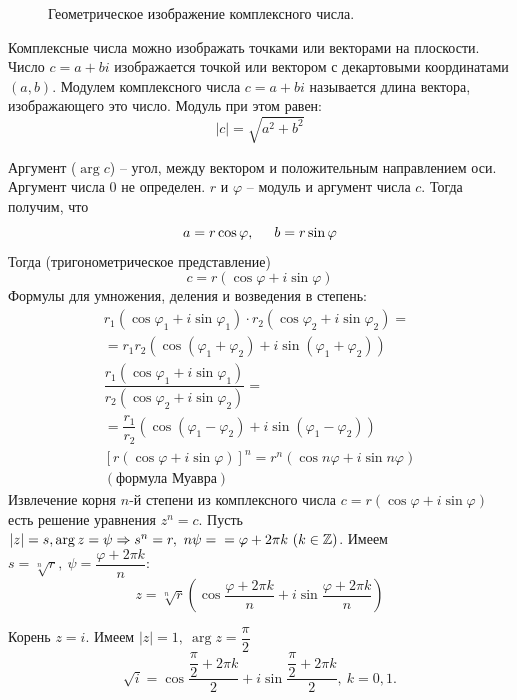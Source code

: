 \begin{multicols}{2}
\begin{figure}
    \caption{Геометрическое изображение комплексного числа.}
    \label{fig:complex_field}
\end{figure}
Комплексные числа можно изображать точками или векторами на плоскости. Число $c=a+bi$ изображается точкой или вектором с декартовыми координатами $(a,b)$.
Модулем комплексного числа $c=a+bi$ называется длина вектора, изображающего это число. Модуль при этом равен:\useshortskip
\[
    |c| = \sqrt{a^2 + b^2}
    \]
\par
Аргумент ($\arg c$) -- угол, между вектором и положительным направлением оси. Аргумент числа 0 не определен.
$r$ и $\varphi$ -- модуль и аргумент числа $c$. Тогда получим, что \[a=r\cos \varphi, \hspace*{0.5cm} b = r\sin \varphi\]
Тогда (тригонометрическое представление)
\[
    c = r(\cos \varphi + i\sin \varphi)
    \]
Формулы для умножения, деления и возведения в степень:
\[
    \begin{array}{c}
        r_1(\cos \varphi_1 + i\sin\varphi_1)\cdot r_2(\cos \varphi_2 + i\sin \varphi_2) = \\ = r_1r_2(\cos(\varphi_1 + \varphi_2) + i\sin(\varphi_1 + \varphi_2))\\[0.5cm]
        \dfrac{r_1(\cos\varphi_1 + i\sin\varphi_1)}{r_2(\cos\varphi_2 + i\sin\varphi_2)} = \\ = \dfrac{r_1}{r_2}\left(\cos\left(\varphi_1-\varphi_2\right) + i\sin\left(\varphi_1 - \varphi_2\right)\right)\\[0.5cm]
        \left[r(\cos\varphi + i\sin\varphi)\right]^n = r^n(\cos n\varphi + i\sin n\varphi)\\(\text{формула Муавра})
    \end{array}
    \]
Извлечение корня $n$-й степени из комплексного числа \mbox{$c = r(\cos\varphi + i\sin\varphi)$} есть решение уравнения $z^n = c$. Пусть $|z| = s, \arg z = \psi \Rightarrow s^n = r,\ n\psi = \\ = \varphi + 2\pi k \ (k\in\mathbb{Z})$. Имеем $s = \sqrt[n]{r}, \ \psi = \dfrac{\varphi + 2\pi k}{n}$:
\[
    z = \sqrt[n]{r} \left(\cos\dfrac{\varphi+2\pi k}{n} + i\sin \dfrac{\varphi + 2\pi k}{n}\right)
    \]
\begin{note}{}{}
    Корень $z = i$. Имеем $|z| = 1, \ \arg z = \dfrac{\pi}{2}$
    \[
        \sqrt{i} = \cos\dfrac{\dfrac{\pi}{2}+2\pi k}{2} + i\sin\dfrac{\dfrac{\pi}{2} + 2\pi k}{2}, \ k = 0,1.
        \]
\end{note}

\end{multicols}
